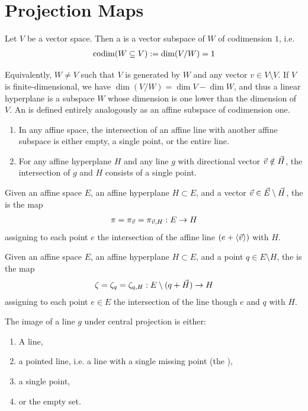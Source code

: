 \section{Projection Maps}
\begin{definition}
	Let $V$ be a vector space. Then a  is a vector subspace of $W$ of codimension $1$, i.e.
	\begin{align*}
		\operatorname{codim}(W \subseteq V) := \dim(V / W) = 1
	\end{align*}
\end{definition}
Equivalently, $W \neq V$ such that $V$ is generated by $W$ and any vector $v \in V \setminus V$. If $V$ is finite-dimensional, we have $\dim(V/W) = \dim V - \dim W$, and thus a linear hyperplane is a subspace $W$ whose dimension is one lower than the dimension of $V$. An  is defined entirely analogously as an affine subspace of codimension one.
\begin{exercise}
	\begin{enumerate}
		\item In any affine space, the intersection of an affine line with another affine subspace is either empty, a single point, or the entire line.
		\item For any affine hyperplane $H$ and any line $g$ with directional vector $\vec{v} \notin \vec{H}$, the intersection of $g$ and $H$ consists of a single point.
	\end{enumerate}
\end{exercise}
\begin{definition}
	Given an affine space $E$, an affine hyperplane $H \subset E$, and a vector $\vec{v} \in \vec{E} \setminus \vec{H}$, the  is the map 
	\begin{align*}
		\pi = \pi_{\vec{v}} = \pi_{\vec{v},H} : E \to H
	\end{align*}
	assigning to each point $e$ the intersection of the affine line $(e + \left\langle \vec{v} \right\rangle)$ with $H$.
\end{definition}
\begin{definition}
	Given an affine space $E$, an affine hyperplane $H \subset E$, and a point $q \in E \setminus H$, the  is the map 
	\begin{align*}
		\zeta = \zeta_q = \zeta_{q,H} : E \setminus(q + \vec{H}) \to H
	\end{align*}
	assigning to each point $e \in E$ the intersection of the line though $e$ and $q$ with $H$.
\end{definition}
\begin{exercise}
	The image of a line $g$ under central projection is either:
	\begin{enumerate}
		\item A line,
		\item a pointed line, i.e. a line with a single missing point (the ),
		\item a single point,
		\item or the empty set.
	\end{enumerate}
\end{exercise}

